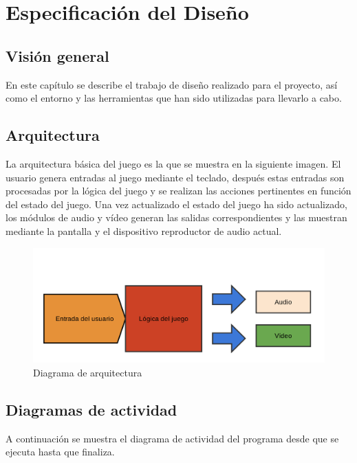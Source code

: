 \chapter{Especificación del Diseño}

\section{Visión general}

	En este capítulo se describe el trabajo de diseño realizado para el proyecto, así como el entorno y las herramientas que han sido utilizadas para llevarlo a cabo.

\section{Arquitectura}

	La arquitectura básica del juego es la que se muestra en la siguiente imagen. El usuario genera entradas al juego mediante el teclado, después estas entradas son procesadas por la lógica del juego y se realizan las acciones pertinentes en función del estado del juego. Una vez actualizado el estado del juego ha sido actualizado, los módulos de audio y vídeo generan las salidas correspondientes y las muestran mediante la pantalla y el dispositivo reproductor de audio actual.

	\begin{figure}[!htp]
		 \centering
		 \includegraphics{fig/architecture}
		 \caption{Diagrama de arquitectura}
		 \label{fig:arch}
	\end{figure}

	\FloatBarrier

\section{Diagramas de actividad}

	A continuación se muestra el diagrama de actividad del programa desde que se ejecuta hasta que finaliza.

